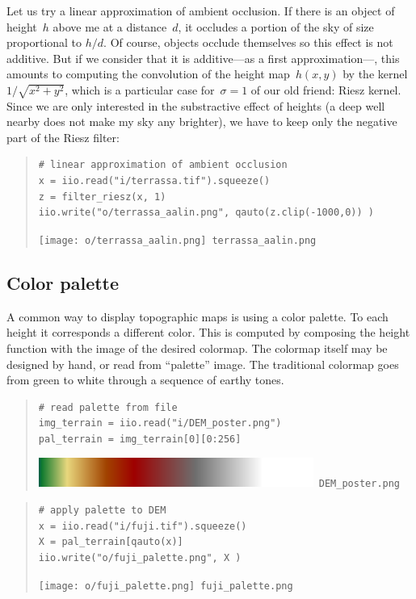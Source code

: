Let us try a linear approximation of ambient occlusion.  If there is an object
of height~$h$ above me at a distance~$d$, it occludes a portion of the sky of
size proportional to $h/d$.  Of course, objects occlude themselves so this
effect is not additive.  But if we consider that it is additive---as a first
approximation---, this amounts to computing the convolution of the height
map~$h(x,y)$ by the kernel~$1/\sqrt{x^2+y^2}$, which is a particular case
for~$\sigma=1$ of our old friend: Riesz kernel.  Since we are only interested
in the substractive effect of heights (a deep well nearby does not make my
sky any brighter), we have to keep only the negative part of the Riesz
filter:

\begin{quote}
\begin{verbatim}
# linear approximation of ambient occlusion
x = iio.read("i/terrassa.tif").squeeze()
z = filter_riesz(x, 1)
iio.write("o/terrassa_aalin.png", qauto(z.clip(-1000,0)) )
\end{verbatim}
\texttt{[image: o/terrassa\_aalin.png]}~\verb+terrassa_aalin.png+
\end{quote}



\clearpage
\subsection{Color palette}

A common way to display topographic maps is using a color palette.
To each height it corresponds a different color.  This is computed by
composing the height function with the image of the desired colormap.  The
colormap itself may be designed by hand, or read from ``palette'' image.
The traditional colormap goes from green to white through a sequence of
earthy tones.

\begin{quote}
\begin{verbatim}
# read palette from file
img_terrain = iio.read("i/DEM_poster.png")
pal_terrain = img_terrain[0][0:256]
\end{verbatim}
\includegraphics{i/DEM_poster.png}~\verb+DEM_poster.png+
\end{quote}

\begin{quote}
\begin{verbatim}
# apply palette to DEM
x = iio.read("i/fuji.tif").squeeze()
X = pal_terrain[qauto(x)]
iio.write("o/fuji_palette.png", X )
\end{verbatim}
\texttt{[image: o/fuji\_palette.png]}~\verb+fuji_palette.png+
\end{quote}

